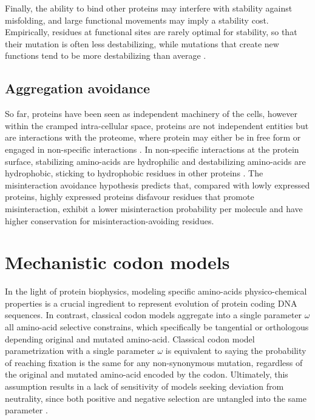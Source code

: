 Finally, the ability to bind other proteins may interfere with stability against misfolding, and large functional movements may imply a stability cost.
Empirically, residues at functional sites are rarely optimal for stability, so that their mutation is often less destabilizing, while mutations that create new functions tend to be more destabilizing than average \citep{Chi2016}.

\subsection{Aggregation avoidance}

So far, proteins have been seen as independent machinery of the cells, however within the cramped intra-cellular space, proteins are not independent entities but are interactions with the proteome, where protein may either be in free form or engaged in non-specific interactions \citep{Yang2012, Zhang2013}.
In non-specific interactions at the protein surface, stabilizing amino-acids are hydrophilic and destabilizing amino-acids are hydrophobic, sticking to hydrophobic residues in other proteins \citep{Dixit2013,Manhart2015}.
The misinteraction avoidance hypothesis predicts that, compared with lowly expressed proteins, highly expressed proteins disfavour residues that promote misinteraction, exhibit a lower misinteraction probability per molecule and have higher conservation for misinteraction-avoiding residues.


\section{Mechanistic \gls{codon} models}
In the light of protein biophysics, modeling specific amino-acids physico-chemical properties is a crucial ingredient to represent evolution of protein coding \acrshort{DNA} sequences.
In contrast, classical \gls{codon} models aggregate into a single parameter $\omega$ all amino-acid selective constrains, which specifically be tangential or orthologous depending original and mutated amino-acid.
Classical \gls{codon} model parametrization with a single parameter $\omega$ is equivalent to saying the probability of reaching fixation is the same for any non-synonymous mutation, regardless of the original and mutated amino-acid encoded by the \gls{codon}.
Ultimately, this assumption results in a lack of sensitivity of models seeking deviation from neutrality, since both positive and negative selection are untangled into the same parameter \citep{Rodrigue2008a}.


